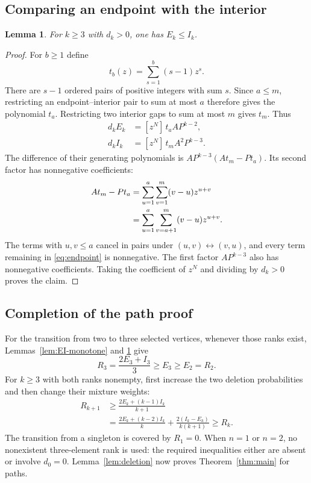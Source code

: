 \documentclass[11pt]{article}
\newtheorem{lemma}[theorem]{Lemma}
\theoremstyle{definition}
\theoremstyle{remark}
\newcommand{\coef}[2]{[z^{#1}]\,#2}
\begin{document}
\subsection{Comparing an endpoint with the interior}

\begin{lemma}\label{lem:EI-order}
For $k\geq3$ with $d_k>0$, one has $E_k\leq I_k$.
\end{lemma}

\begin{proof}
For $b\geq1$ define
\[
 t_b(z)=\sum_{s=1}^{b}(s-1)z^s.
\]
There are $s-1$ ordered pairs of positive integers with sum $s$. Since
$a\leq m$, restricting an endpoint--interior pair to sum at most $a$
therefore gives the polynomial $t_a$. Restricting two interior gaps to
sum at most $m$ gives $t_m$. Thus
\begin{align}
 d_kE_k&=\coef{N}{t_a A P^{k-2}},\label{eq:E-count}\\
 d_kI_k&=\coef{N}{t_m A^2P^{k-3}}.\label{eq:I-count}
\end{align}
The difference of their generating polynomials is
$AP^{k-3}(At_m-Pt_a)$. Its second factor has nonnegative coefficients:
\begin{align}
 At_m-Pt_a
 &=\sum_{u=1}^{a}\sum_{v=1}^{m}(v-u)z^{u+v}\notag\\
 &=\sum_{u=1}^{a}\sum_{v=a+1}^{m}(v-u)z^{u+v}.
 \label{eq:endpoint}
\end{align}
The terms with $u,v\leq a$ cancel in pairs under $(u,v)\leftrightarrow
(v,u)$, and every term remaining in \eqref{eq:endpoint} is nonnegative.
The first factor $AP^{k-3}$ also has nonnegative coefficients. Taking the
coefficient of $z^N$ and dividing by $d_k>0$ proves the claim.
\end{proof}

\subsection{Completion of the path proof}

For the transition from two to three selected vertices, whenever those
ranks exist, Lemmas~\ref{lem:EI-monotone} and \ref{lem:EI-order} give
\[
 R_3=\frac{2E_3+I_3}{3}\geq E_3\geq E_2=R_2.
\]
For $k\geq3$ with both ranks nonempty, first increase the two deletion
probabilities and then change their mixture weights:
\begin{align*}
 R_{k+1}
 &\geq\frac{2E_k+(k-1)I_k}{k+1}\\
 &=\frac{2E_k+(k-2)I_k}{k}
   +\frac{2(I_k-E_k)}{k(k+1)}
 \geq R_k.
\end{align*}
The transition from a singleton is covered by $R_1=0$. When $n=1$ or
$n=2$, no nonexistent three-element rank is used: the required
inequalities either are absent or involve $d_0=0$.
Lemma~\ref{lem:deletion} now proves Theorem~\ref{thm:main} for paths.
\end{document}
